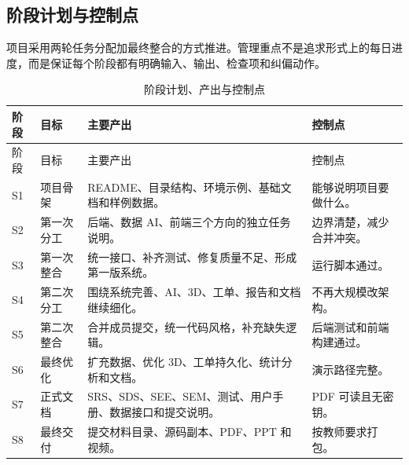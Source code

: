 \documentclass[12pt,a4paper]{ctexart}
\begin{document}
\subsection{阶段计划与控制点}
项目采用两轮任务分配加最终整合的方式推进。管理重点不是追求形式上的每日进度，而是保证每个阶段都有明确输入、输出、检查项和纠偏动作。
\begin{longtable}{L{2.0cm}L{3.2cm}L{5.2cm}L{4.2cm}}
\caption{阶段计划、产出与控制点}\\
\toprule
阶段 & 目标 & 主要产出 & 控制点 \\
\midrule
\endfirsthead
\toprule
阶段 & 目标 & 主要产出 & 控制点 \\
\midrule
\endhead
S1 & 项目骨架 & README、目录结构、环境示例、基础文档和样例数据。 & 能够说明项目要做什么。 \\
S2 & 第一次分工 & 后端、数据 AI、前端三个方向的独立任务说明。 & 边界清楚，减少合并冲突。 \\
S3 & 第一次整合 & 统一接口、补齐测试、修复质量不足、形成第一版系统。 & 运行脚本通过。 \\
S4 & 第二次分工 & 围绕系统完善、AI、3D、工单、报告和文档继续细化。 & 不再大规模改架构。 \\
S5 & 第二次整合 & 合并成员提交，统一代码风格，补充缺失逻辑。 & 后端测试和前端构建通过。 \\
S6 & 最终优化 & 扩充数据、优化 3D、工单持久化、统计分析和文档。 & 演示路径完整。 \\
S7 & 正式文档 & SRS、SDS、SEE、SEM、测试、用户手册、数据接口和提交说明。 & PDF 可读且无密钥。 \\
S8 & 最终交付 & 提交材料目录、源码副本、PDF、PPT 和视频。 & 按教师要求打包。 \\
\bottomrule
\end{longtable}
\end{document}
